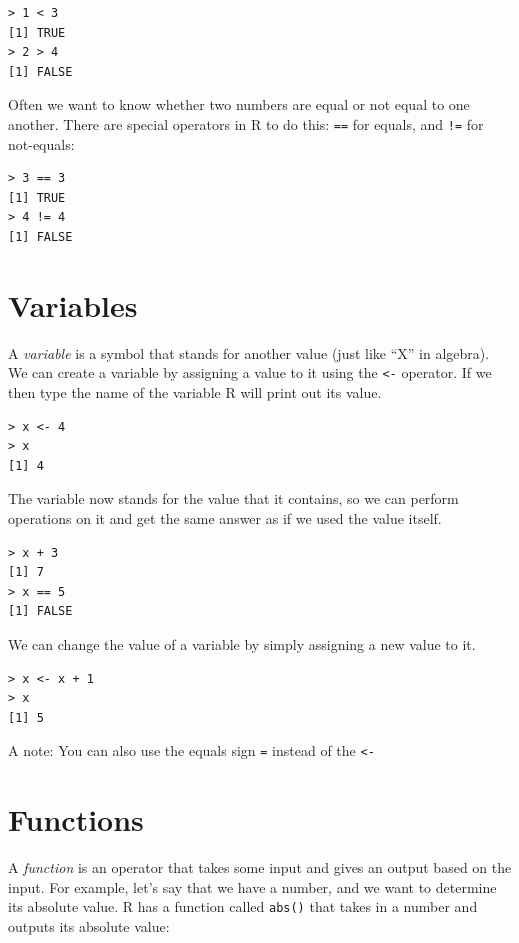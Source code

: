 \documentclass[
  12pt,
]{book}
\begin{document}
\begin{verbatim}
> 1 < 3
[1] TRUE
> 2 > 4
[1] FALSE
\end{verbatim}

Often we want to know whether two numbers are equal or not equal to one another. There are special operators in R to do this: \texttt{==} for equals, and \texttt{!=} for not-equals:

\begin{verbatim}
> 3 == 3
[1] TRUE
> 4 != 4
[1] FALSE
\end{verbatim}

\hypertarget{variables}{%
\section{Variables}\label{variables}}

A \emph{variable} is a symbol that stands for another value (just like ``X'' in algebra). We can create a variable by assigning a value to it using the \texttt{\textless{}-} operator. If we then type the name of the variable R will print out its value.

\begin{verbatim}
> x <- 4
> x
[1] 4
\end{verbatim}

The variable now stands for the value that it contains, so we can perform operations on it and get the same answer as if we used the value itself.

\begin{verbatim}
> x + 3
[1] 7
> x == 5
[1] FALSE
\end{verbatim}

We can change the value of a variable by simply assigning a new value to it.

\begin{verbatim}
> x <- x + 1
> x
[1] 5
\end{verbatim}

A note: You can also use the equals sign \texttt{=} instead of the \texttt{\textless{}-}

\hypertarget{functions}{%
\section{Functions}\label{functions}}

A \emph{function} is an operator that takes some input and gives an output based on the input. For example, let's say that we have a number, and we want to determine its absolute value. R has a function called \texttt{abs()} that takes in a number and outputs its absolute value:
\end{document}
